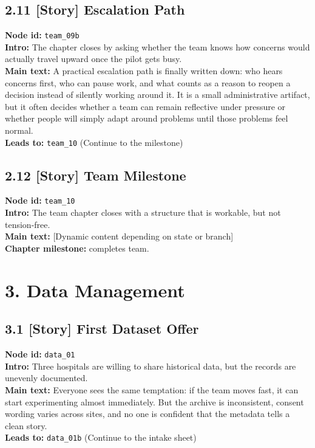 \documentclass[11pt]{article}
\begin{document}
\subsection*{2.11 [Story] Escalation Path}
\textbf{Node id:} \texttt{team\_09b}\\
\textbf{Intro:} The chapter closes by asking whether the team knows how concerns would actually travel upward once the pilot gets busy.\\
\textbf{Main text:} A practical escalation path is finally written down: who hears concerns first, who can pause work, and what counts as a reason to reopen a decision instead of silently working around it. It is a small administrative artifact, but it often decides whether a team can remain reflective under pressure or whether people will simply adapt around problems until those problems feel normal.\\
\textbf{Leads to:} \texttt{team\_10} (Continue to the milestone)\\
\subsection*{2.12 [Story] Team Milestone}
\textbf{Node id:} \texttt{team\_10}\\
\textbf{Intro:} The team chapter closes with a structure that is workable, but not tension-free.\\
\textbf{Main text:} [Dynamic content depending on state or branch]\\
\textbf{Chapter milestone:} completes team.\\
\section*{3. Data Management}
\subsection*{3.1 [Story] First Dataset Offer}
\textbf{Node id:} \texttt{data\_01}\\
\textbf{Intro:} Three hospitals are willing to share historical data, but the records are unevenly documented.\\
\textbf{Main text:} Everyone sees the same temptation: if the team moves fast, it can start experimenting almost immediately. But the archive is inconsistent, consent wording varies across sites, and no one is confident that the metadata tells a clean story.\\
\textbf{Leads to:} \texttt{data\_01b} (Continue to the intake sheet)\\
\end{document}
